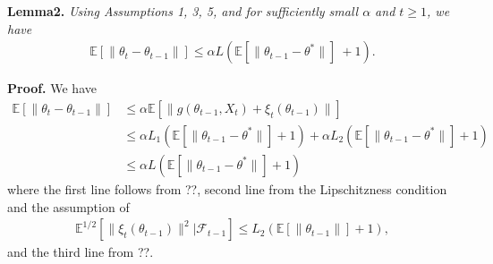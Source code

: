 \documentclass[a4paper]{article}
\newcommand{\norm}[1]{\|#1 \|}
\newcommand{\Exs}{\mathbb{E}}
\newcommand{\thetastar}{\theta^*}
\newcommand{\stepsize}{\alpha}
\begin{document}
	\textbf{Lemma2.} \textit{Using Assumptions 1, 3, 5, and for sufficiently small $\stepsize$ and $t \ge 1$, we have
	\begin{align*}
		\Exs\left[\norm{\theta_{t} - \theta_{t - 1}}\right] \leq \stepsize L\left(\Exs\left[\norm{\theta_{t - 1} - \thetastar}\right]\ + 1\right).
	\end{align*}
	}
	
	\textbf{Proof.} We have
	\begin{align*}
		\Exs\left[\norm{\theta_{t} - \theta_{t - 1}}\right] &\leq \stepsize\Exs\left[\norm{g\left(\theta_{t - 1}, X_{t}\right) + \xi_{t}\left(\theta_{t - 1}\right)}\right]\\
		& \leq \stepsize L_{1}\left(\Exs\left[\norm{\theta_{t - 1} - \thetastar}\right] + 1\right) + \stepsize L_{2}\left(\Exs\left[\norm{\theta_{t - 1} - \thetastar}\right] + 1\right)\\
		& \leq \stepsize L\left(\Exs\left[\norm{\theta_{t - 1} - \thetastar}\right] + 1\right)
	\end{align*}
	where the first line follows from ??, second line from the Lipschitzness condition and the assumption of
	\begin{align*}
		\Exs^{1 / 2 }\left[\norm{\xi_{t}\left(\theta_{t - 1}\right)}^{2} | \mathcal{F}_{t - 1}\right] \leq L_{2}\left(\Exs\left[\norm{\theta_{t - 1}}\right] + 1\right),
	\end{align*}
	 and the third line from ??.\\
		
\end{document}
